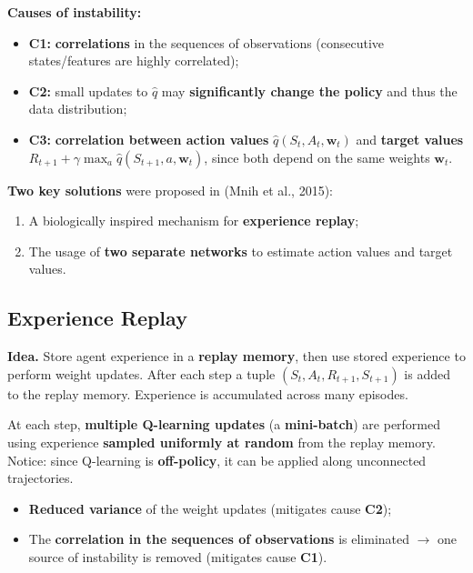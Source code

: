 \documentclass[11pt,a4paper]{article}
\theoremstyle{definition}
\theoremstyle{plain}
\theoremstyle{remark}
\begin{document}
\textbf{Causes of instability:}
\begin{itemize}
    \item \textbf{C1:} \textbf{correlations} in the sequences of observations (consecutive states/features are highly correlated);
    \item \textbf{C2:} small updates to $\hat{q}$ may \textbf{significantly change the policy} and thus the data distribution;
    \item \textbf{C3:} \textbf{correlation between action values} $\hat{q}(S_t, A_t, \mathbf{w}_t)$ and \textbf{target values} $R_{t+1} + \gamma \max_a \hat{q}(S_{t+1}, a, \mathbf{w}_t)$, since both depend on the same weights $\mathbf{w}_t$.
\end{itemize}

\textbf{Two key solutions} were proposed in (Mnih et al., 2015):
\begin{enumerate}
    \item A biologically inspired mechanism for \textbf{experience replay};
    \item The usage of \textbf{two separate networks} to estimate action values and target values.
\end{enumerate}

\subsection{Experience Replay}

\textbf{Idea.} Store agent experience in a \textbf{replay memory}, then use stored experience to perform weight updates. After each step a tuple $(S_t, A_t, R_{t+1}, S_{t+1})$ is added to the replay memory. Experience is accumulated across many episodes.

At each step, \textbf{multiple Q-learning updates} (a \textbf{mini-batch}) are performed using experience \textbf{sampled uniformly at random} from the replay memory. Notice: since Q-learning is \textbf{off-policy}, it can be applied along unconnected trajectories.

\begin{tcolorbox}[colback=green!5!white, colframe=green!60!black, title={Advantages of Experience Replay}]
\begin{itemize}
    \item \textbf{Reduced variance} of the weight updates (mitigates cause \textbf{C2});
    \item The \textbf{correlation in the sequences of observations} is eliminated $\to$ one source of instability is removed (mitigates cause \textbf{C1}).
\end{itemize}
\end{tcolorbox}
\end{document}
